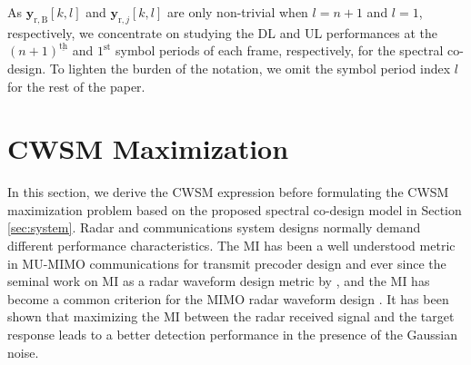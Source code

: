 \documentclass[9pt,journal]{IEEEtran}
\newcommand{\paren}[1]{\left({#1}\right)}
\newcommand{\bracket}[1]{{\left [{#1}\right ]}}
\newcommand{\ith}[1]    {{#1}^{\underline{\text{th}}}}
\theoremstyle{definition}
\begin{document}
As $\mathbf{y}_{\mathrm{r,B}}\bracket{k,l}$ and $\mathbf{y}_{\mathrm{r},j}\bracket{k,l}$ are only non-trivial when $l=n+1$ and $l=1$, respectively, we concentrate on studying the DL and UL performances at the $\ith{\paren{n+1}}$ and $1^{\textrm{st}}$ symbol periods of each frame, respectively, for the spectral co-design. To lighten the burden of the notation, we omit the symbol period index $l$ for the rest of the paper.
\section{CWSM Maximization}
\label{sec: formulation}
In this section, we derive the CWSM expression before formulating the CWSM maximization problem based on the proposed spectral co-design model in Section \ref{sec:system}. Radar and communications system designs normally demand different performance characteristics. The MI has been a well understood metric in MU-MIMO communications for transmit precoder design\cite{Luo2011IterativeWMMSE} and ever since the seminal work on MI as a radar waveform design metric by \cite{Bellinformation}, and the MI has become a common criterion for the MIMO radar waveform design \cite{Jammer_game,NaghshTSP2017}. It has been shown that maximizing the MI between the radar received signal and the target response leads to a better detection performance in the presence of the Gaussian noise\cite{Jammer_game}. 
	
\end{document}
